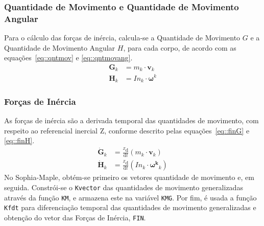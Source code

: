 \bigskip {}

\subsubsection{Quantidade de Movimento e Quantidade de Movimento Angular}

Para o cálculo das forças de inércia, calcula-se a Quantidade de Movimento $G$ e
a Quantidade de Movimento Angular $H$, para cada corpo, de acordo com as
equações~\ref{eq::qntmov} e \ref{eq::qntmovang}.
%
\begin{align}
	\mathbf{G}_{k} &= m_{k} \cdot \mathbf{v}_{k} \label{eq::qntmov} \\
	\mathbf{H}_{k} &= In_{k} \cdot \boldsymbol\omega^{k} \label{eq::qntmovang}
\end{align}
%

\subsubsection{Forças de Inércia}

As forças de inércia são a derivada temporal das quantidades de movimento, com
respeito ao referencial inercial Z, conforme descrito pelas
equações~\ref{eq::finG} e \ref{eq::finH}.
%
\begin{align}
	\dot{\mathbf{G}}_{k} &= \frac{^{Z}\mathrm{d}}{\mathrm{d} t} (m_{k} \cdot
	\mathbf{v}_{k}) \label{eq::finG} \\
	\dot{\mathbf{H}}_{k} &= \frac{^{Z}\mathrm{d}}{\mathrm{d} t} (In_{k} \cdot
	\mathbf{\boldsymbol\omega^{k}}_{k}) \label{eq::finH}	
\end{align}
%
No Sophia-Maple, obtém-se primeiro os vetores quantidade de movimento e, em
seguida. Constrói-se o \texttt{Kvector} das quantidades de movimento
generalizadas através da função \texttt{KM}, e armazena este na variável
\texttt{KMG}. Por fim, é usada a função \texttt{Kfdt} para diferenciação
temporal das quantidades de movimento generalizadas e obtenção do vetor das
Forças de Inércia, \texttt{FIN}.


